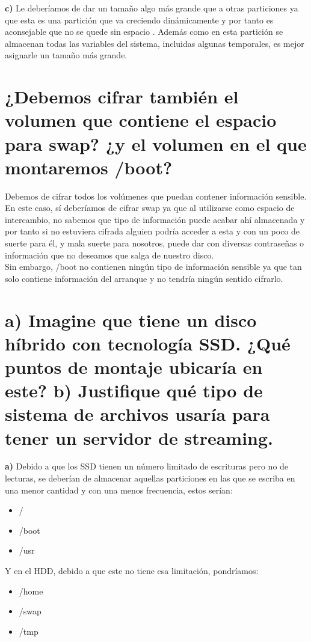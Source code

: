 \textbf{c)} Le deberíamos de dar un tamaño algo más grande que a otras particiones ya que esta es una partición que va creciendo dinámicamente y por tanto es aconsejable que no se quede sin espacio \cite{var}. Además como en esta partición se almacenan todas las variables del sistema, incluidas algunas temporales, es mejor asignarle un tamaño más grande.


\section{¿Debemos cifrar también el volumen que contiene el espacio para swap? ¿y el volumen en el que montaremos /boot?}
Debemos de cifrar todos los volúmenes que puedan contener información sensible. En este caso, sí deberíamos de cifrar swap ya que al utilizarse como espacio de intercambio, no sabemos que tipo de información puede acabar ahí almacenada y por tanto si no estuviera cifrada alguien podría acceder a esta y con un poco de suerte para él, y mala suerte para nosotros, puede dar con diversas contraseñas o información que no deseamos que salga de nuestro disco. \\

Sin embargo, /boot no contienen ningún tipo de información sensible ya que tan solo contiene información del arranque y no tendría ningún sentido cifrarlo.

\section{a) Imagine que tiene un disco híbrido con tecnología SSD. ¿Qué puntos de montaje ubicaría en este? \newline b) Justifique qué tipo de sistema de archivos usaría para tener un servidor de streaming.}
\textbf{a)} Debido a que los SSD tienen un número limitado de escrituras pero no de lecturas, se deberían de almacenar aquellas particiones en las que se escriba en una menor cantidad y con una menos frecuencia, estos serían:
\begin{itemize}
	\item /
	\item /boot
	\item /usr
\end{itemize}
Y en el HDD, debido a que este no tiene esa limitación, pondríamos: 
\begin{itemize}
	\item /home
	\item /swap
	\item /tmp
\end{itemize}


